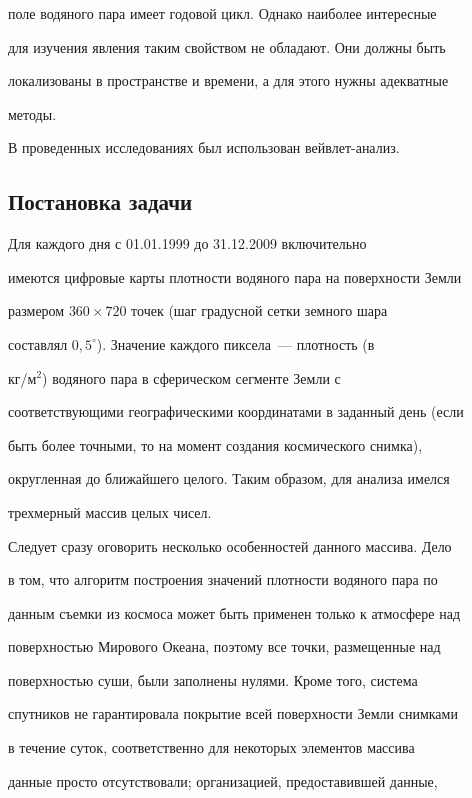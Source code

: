 поле водяного пара имеет годовой цикл. Однако наиболее интересные

для изучения явления таким свойством не обладают. Они должны быть

локализованы в пространстве и времени, а для этого нужны адекватные

методы.



В проведенных исследованиях был использован вейвлет-анализ.



\subsection{Постановка задачи}



Для каждого дня с 01.01.1999 до 31.12.2009 включительно

имеются цифровые карты плотности водяного пара на поверхности Земли

размером $360 \times 720$ точек (шаг градусной сетки земного шара

составлял $0{,}5^{\circ}$). Значение каждого пиксела~--- плотность (в

кг/м$^2$)  водяного пара в сферическом сегменте Земли с

соответствующими географическими координатами в заданный день (если

быть более точными, то на момент создания космического снимка),

округленная до ближайшего целого. Таким образом, для анализа имелся

трехмерный массив целых чисел.



Следует сразу оговорить несколько особенностей данного массива. Дело

в том, что алгоритм построения значений плотности водяного пара по

данным съемки из космоса может быть применен только к атмосфере над

поверхностью Мирового Океана, поэтому все точки, размещенные над

поверхностью суши, были заполнены нулями. Кроме того, система

спутников не гарантировала покрытие всей поверхности Земли снимками

в течение суток, соответственно для некоторых элементов массива

данные просто отсутствовали; организацией, предоставившей данные,

